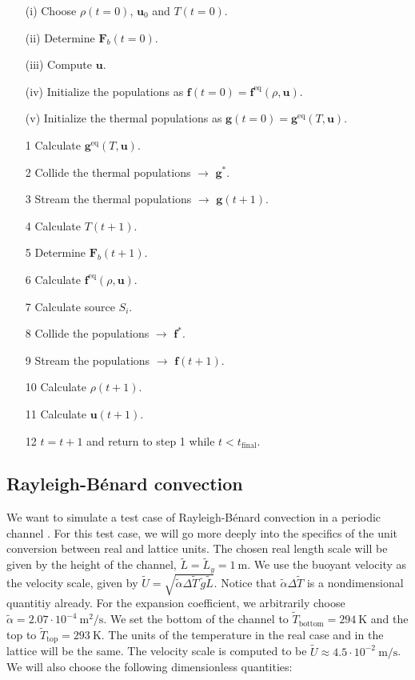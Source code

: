 \begin{itemize}\label{it:Algorithm thermal Lattice Boltzmann}
    \item[(i)] Choose $\rho(t=0)$, $\bm{u}_0$ and $T(t=0)$.
    \item[(ii)] Determine $\bm{F}_b(t=0)$.
    \item[(iii)] Compute $\bm{u}$. 
    \item[(iv)] Initialize the populations as $\bm{f}(t=0) = \bm{f}^{\text{eq}}(\rho, \bm{u})$. 
    \item[(v)] Initialize the thermal populations as $\bm{g}(t=0) = \bm{g}^{\text{eq}}(T, \bm{u})$. 
    \item[1] Calculate $\bm{g}^{\text{eq}}(T, \bm{u})$.
    \item[2] Collide the thermal populations $\rightarrow$ $\bm{g}^{\ast}$.
    \item[3] Stream the thermal populations $\rightarrow$ $\bm{g}(t + 1)$.
    \item[4] Calculate $T(t+1)$.
    \item[5] Determine $\bm{F}_b(t+1)$.
    \item[6] Calculate $\bm{f}^{\text{eq}}(\rho, \bm{u})$.
    \item[7] Calculate source $S_i$.
    \item[8] Collide the populations $\rightarrow$ $\bm{f}^{\ast}$.
    \item[9] Stream the populations $\rightarrow$ $\bm{f}(t + 1)$.
    \item[10] Calculate $\rho(t + 1)$.
    \item[11] Calculate $\bm{u}(t + 1)$.
    \item[12] $t = t + 1$ and return to step 1 while $t < t_{\text{final}}$.
\end{itemize}

\subsection{Rayleigh-Bénard convection}
We want to simulate a test case of Rayleigh-Bénard convection in a periodic channel \cite{Rayleigh}. For this test case, we will go more deeply into the specifics of the unit conversion between real and lattice units. The chosen real length scale will be given by the height of the channel, $\widetilde{L} = \widetilde{L}_y = 1~\text{m}$. We use the buoyant velocity as the velocity scale, given by $\widetilde{U} = \sqrt{\widetilde{\alpha}\Delta\widetilde{T}\, \widetilde{g}\widetilde{L}}$. Notice that $\widetilde{\alpha}\Delta\widetilde{T}$ is a nondimensional quantitiy already. For the expansion coefficient, we arbitrarily choose $\widetilde{\alpha} = 2.07 \cdot 10^{-4}~\text{m}^2/\text{s}$. We set the bottom of the channel to $\widetilde{T}_{\text{bottom}} = 294~\text{K}$ and the top to $\widetilde{T}_{\text{top}} = 293~\text{K}$. The units of the temperature in the real case and in the lattice will be the same. The velocity scale is computed to be $\widetilde{U} \approx 4.5 \cdot 10^{-2}~\text{m}/\text{s}$. We will also choose the following dimensionless quantities:


